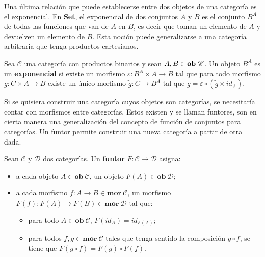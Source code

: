 Una última relación que puede establecerse entre dos objetos de una categoría es el exponencial. En \textbf{Set}, el exponencial de dos conjuntos $A$ y $B$ es el conjunto $B^A$ de todas las funciones que van de $A$ en $B$, es decir que toman un elemento de $A$ y devuelven un elemento de $B$. Esta noción puede generalizarse a una categoría arbitraria que tenga productos cartesianos.

\begin{definition}[Exponencial]
Sea $\mathscr{C}$ una categoría con productos binarios y sean $A,B \in \text{\bf ob} \ \mathscr{C}$. Un objeto $B^A$ es un \textbf{exponencial} si existe un morfismo $\varepsilon : B^A \times A \rightarrow B$ tal que para todo morfismo $g : C \times A \rightarrow B$ existe un único morfismo $\tilde{g} : C \rightarrow B^A$ tal que $g = \varepsilon \circ (\tilde{g} \times id_A)$.
\end{definition}

Si se quisiera construir una categoría cuyos objetos son categorías, se necesitaría contar con morfismos entre categorías. Estos existen y se llaman funtores, son en cierta manera una generalización del concepto de función de conjuntos para categorías. Un funtor permite construir una nueva categoría a partir de otra dada.
 
\begin{definition}[Funtor]
Sean $\mathscr{C}$ y $\mathscr{D}$ dos categorías. Un \textbf{funtor} $\mathit{F} : \mathscr{C} \rightarrow \mathscr{D}$ asigna:
\begin{itemize}[noitemsep,label=$\blacktriangleright$]
	\item a cada objeto $A \in \mathbf{ob} \ \mathscr{C}$, un objeto $\mathit{F}(A) \in \mathbf{ob} \ \mathscr{D}$;
	\item a cada morfismo $f : A \rightarrow B \in \mathbf{mor} \ \mathscr{C}$, un morfismo $\mathit{F}(f) : \mathit{F}(A) \rightarrow \mathit{F}(B) \in \mathbf{mor} \ \mathscr{D}$ tal que: 
	\begin{itemize}[noitemsep,label=$\bullet$]
		\item para todo $A \in \mathbf{ob} \ \mathscr{C}$, $\mathit{F}(id_A) = id_{\mathit{F}(A)}$;
		\item para todos $f,g \in \mathbf{mor} \ \mathscr{C}$ tales que tenga sentido la composición $g \circ f$, se tiene que $\mathit{F}(g \circ f) = \mathit{F}(g) \circ \mathit{F}(f)$.
	\end{itemize}
\end{itemize}
\end{definition}

